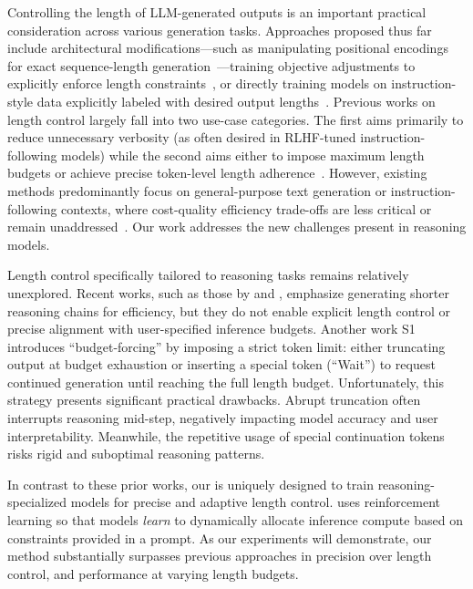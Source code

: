 Controlling the length of LLM-generated outputs is an important practical consideration across various generation tasks. Approaches proposed thus far include architectural modifications—such as manipulating positional encodings for exact sequence-length generation~\citep{butcher2024preciselengthcontrollarge}—training objective adjustments to explicitly enforce length constraints~\citep{jie2023prompt,singhal2024longwaygoinvestigating}, or directly training models on instruction-style data explicitly labeled with desired output lengths~\citep{yuan2024followinglengthconstraintsinstructions}.  
Previous works on length control largely fall into two use-case categories. The first aims primarily to reduce unnecessary verbosity (as often desired in RLHF-tuned instruction-following models) while the second aims either to impose maximum length budgets or achieve precise token-level length adherence~\citep{jie2023prompt,yuan2024followinglengthconstraintsinstructions,singhal2024longwaygoinvestigating}.  
However, existing methods predominantly focus on general-purpose text generation or instruction-following contexts, where cost-quality efficiency trade-offs are less critical or remain unaddressed~\citep{jie2023prompt,yuan2024followinglengthconstraintsinstructions,butcher2024preciselengthcontrollarge}. 
Our work addresses the new challenges present in reasoning models.

Length control specifically tailored to reasoning tasks remains relatively unexplored. Recent works, such as those by \citet{arora2025traininglanguagemodelsreason} and \citet{kang2024c3otgeneratingshorterchainofthought}, emphasize generating shorter reasoning chains for efficiency, but they do not enable explicit length control or precise alignment with user-specified inference budgets. Another work S1~\citep{muennighoff2025s1simpletesttimescaling} introduces ``budget-forcing'' by imposing a strict token limit: either truncating output at budget exhaustion or inserting a special token (``Wait'') to request continued generation until reaching the full length budget. Unfortunately, this strategy presents significant practical drawbacks. Abrupt truncation often interrupts reasoning mid-step, negatively impacting model accuracy and user interpretability. Meanwhile, the repetitive usage of special continuation tokens risks rigid and suboptimal reasoning patterns.  

In contrast to these prior works, our \ours{} is uniquely designed to train reasoning-specialized models for precise and adaptive length control. \ours{} uses reinforcement learning so that models \textit{learn} to dynamically allocate inference compute based on constraints provided in a prompt.
As our experiments will demonstrate, our method substantially surpasses previous approaches in precision over length control, and performance at varying length budgets.

